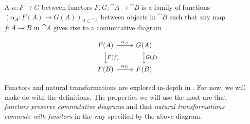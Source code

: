 \begin{definition}
A  $\alpha:F\rightarrow G$ between functors $F,G:\cat{A}\rightarrow \cat{B}$ is a family of functions $(\alpha_A:F(A)\rightarrow G(A))_{A\in \cat{A}}$ between objects in $\cat{B}$ such that any map $f:A\rightarrow B$ in $\cat{A}$ gives rise to a commutative diagram

\[\begin{tikzcd}
F(A) \arrow[r, "\alpha_A"] \arrow[d, "F(f)"] & G(A) \arrow[d, "G(f)"] \\
F(B) \arrow[r, "\alpha_B"]                   & F(B)                  
\end{tikzcd}\]
\end{definition}
Functors and natural transformations are explored in-depth in \cite{Leinster}. For now, we will make do with the definitions. The properties we will use the most are that \textit{functors preserve commutative diagrams} and that \textit{natural transformations commute with functors} in the way specified by the above diagram. 